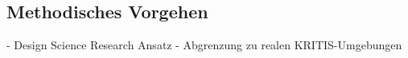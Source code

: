 \subsection{Methodisches Vorgehen} \label{sec:Methodisches Vorgehen}

- Design Science Research Ansatz
- Abgrenzung zu realen KRITIS-Umgebungen